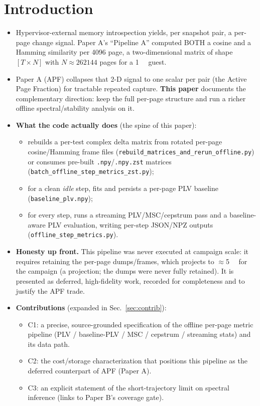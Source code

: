 \documentclass[conference]{IEEEtran}
\begin{document}
\section{Introduction}
\begin{itemize}
  \item Hypervisor-external memory introspection yields, per snapshot pair, a
        per-page change signal. Paper A's ``Pipeline A'' computed BOTH a cosine
        and a Hamming similarity per \SI{4096}{\byte} page, a two-dimensional
        matrix of shape $[T \times N]$ with $N \approx \num{262144}$ pages for a
        \SI{1}{\gibi\byte} guest.
  \item Paper A (APF) collapses that 2-D signal to one scalar per pair (the
        Active Page Fraction) for tractable repeated capture. \textbf{This
        paper} documents the complementary direction: keep the full per-page
        structure and run a richer offline spectral/stability analysis on it.
  \item \textbf{What the code actually does} (the spine of this paper):
    \begin{itemize}
      \item rebuilds a per-test complex delta matrix from rotated per-page
            cosine/Hamming frame files (\texttt{rebuild\_matrices\_and\_rerun\_offline.py})
            or consumes pre-built \texttt{.npy}/\texttt{.npy.zst} matrices
            (\texttt{batch\_offline\_step\_metrics\_zst.py});
      \item for a clean \emph{idle} step, fits and persists a per-page PLV
            baseline (\texttt{baseline\_plv.npy});
      \item for every step, runs a streaming PLV/MSC/cepstrum pass and a
            baseline-aware PLV evaluation, writing per-step JSON/NPZ outputs
            (\texttt{offline\_step\_metrics.py}).
    \end{itemize}
  \item \textbf{Honesty up front.} This pipeline was never executed at campaign
        scale: it requires retaining the per-page dumps/frames, which projects
        to $\approx$\SI{5}{\tebi\byte} for the campaign (a projection; the dumps
        were never fully retained). It is presented as deferred, high-fidelity
        work, recorded for completeness and to justify the APF trade.
  \item \textbf{Contributions} (expanded in Sec.~\ref{sec:contrib}):
    \begin{itemize}
      \item C1: a precise, source-grounded specification of the offline
            per-page metric pipeline (PLV / baseline-PLV / MSC / cepstrum /
            streaming stats) and its data path.
      \item C2: the cost/storage characterization that positions this pipeline
            as the deferred counterpart of APF (Paper A).
      \item C3: an explicit statement of the short-trajectory limit on spectral
            inference (links to Paper B's coverage gate).
    \end{itemize}
\end{itemize}
\end{document}
